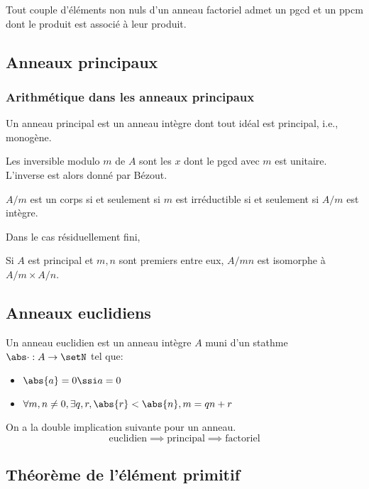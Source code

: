 \documentclass[a4paper,11pt,twocolumn]{article}\usepackage[landscape]{geometry}
\begin{document}
     Tout couple d'éléments non nuls d'un anneau factoriel admet un pgcd et un ppcm dont le produit est associé à leur produit.

  \subsection{Anneaux principaux}

    \subsubsection{Arithmétique dans les anneaux principaux}

     Un anneau principal est un anneau intègre dont tout idéal est principal, i.e., monogène.

     Les inversible modulo $m$ de $A$ sont les $x$ dont le pgcd avec $m$ est unitaire. L'inverse est alors donné par Bézout.

     $A/m$ est un corps si et seulement si $m$ est irréductible si et seulement si $A/m$ est intègre.

      Dans le cas résiduellement fini, 

     Si $A$ est principal et $m,n$ sont premiers entre eux, $A/mn$ est isomorphe à $A/m\times A/n$.

  \subsection{Anneaux euclidiens}

     Un anneau euclidien est un anneau intègre $A$ muni d'un stathme $\abs\cdot:A\rightarrow\setN$ tel que:
    \begin{itemize}
      \item $\abs{a}=0\ssi a=0$
      \item $\forall m,n\neq 0, \exists q,r, \abs{r}<\abs{n}, m=qn+r$
    \end{itemize}

     On a la double implication suivante pour un anneau.
    \[\text{euclidien} \implies \text{principal} \implies \text{factoriel}\]


  \subsection{Théorème de l'élément primitif}
\end{document}
